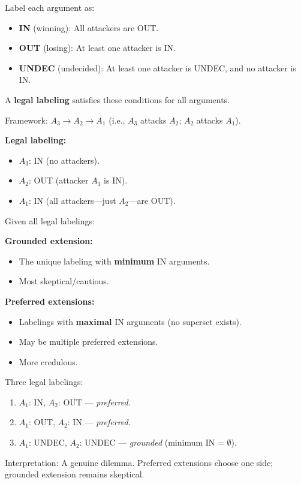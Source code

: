 \begin{defbox}
Label each argument as:
\begin{itemize}
  \item \textbf{IN} (winning): All attackers are OUT.
  \item \textbf{OUT} (losing): At least one attacker is IN.
  \item \textbf{UNDEC} (undecided): At least one attacker is UNDEC, and no attacker is IN.
\end{itemize}

A \textbf{legal labeling} satisfies these conditions for all arguments.
\end{defbox}

\begin{exbox}
Framework: $A_3 \to A_2 \to A_1$ (i.e., $A_3$ attacks $A_2$; $A_2$ attacks $A_1$).

\textbf{Legal labeling:}
\begin{itemize}
  \item $A_3$: IN (no attackers).
  \item $A_2$: OUT (attacker $A_3$ is IN).
  \item $A_1$: IN (all attackers---just $A_2$---are OUT).
\end{itemize}
\end{exbox}

\begin{defbox}
Given all legal labelings:

\textbf{Grounded extension:}
\begin{itemize}
  \item The unique labeling with \textbf{minimum} IN arguments.
  \item Most skeptical/cautious.
\end{itemize}

\textbf{Preferred extensions:}
\begin{itemize}
  \item Labelings with \textbf{maximal} IN arguments (no superset exists).
  \item May be multiple preferred extensions.
  \item More credulous.
\end{itemize}
\end{defbox}

\begin{exbox}
Three legal labelings:
\begin{enumerate}
  \item $A_1$: IN, $A_2$: OUT --- \textit{preferred}.
  \item $A_1$: OUT, $A_2$: IN --- \textit{preferred}.
  \item $A_1$: UNDEC, $A_2$: UNDEC --- \textit{grounded} (minimum IN = $\emptyset$).
\end{enumerate}

Interpretation: A genuine dilemma. Preferred extensions choose one side; grounded extension remains skeptical.
\end{exbox}

